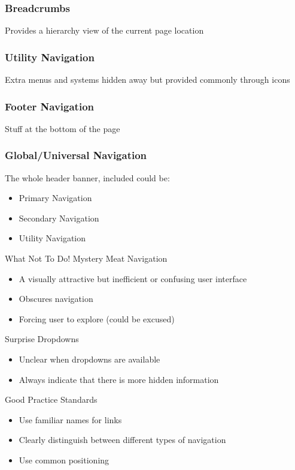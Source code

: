 \subsubsection{Breadcrumbs}
Provides a hierarchy view of the current page location
\subsubsection{Utility Navigation}
Extra menus and systems hidden away but provided commonly through icons
\subsubsection{Footer Navigation}
Stuff at the bottom of the page
\subsubsection{Global/Universal Navigation}
The whole header banner, included could be:
\begin{itemize}
	\item Primary Navigation
	\item Secondary Navigation
	\item Utility Navigation
\end{itemize}

\begin{note}{What Not To Do!}
	Mystery Meat Navigation
	\begin{itemize}
		\item A visually attractive but inefficient or confusing user interface
		\item Obscures navigation
		\item Forcing user to explore (could be excused)	
	\end{itemize}
	Surprise Dropdowns
	\begin{itemize}
		\item Unclear when dropdowns are available
		\item Always indicate that there is more hidden information	
	\end{itemize}
\end{note}

\begin{note}{Good Practice Standards}
	\begin{itemize}
		\item Use familiar names for links
		\item Clearly distinguish between different types of navigation
		\item Use common positioning	
	\end{itemize}
	
\end{note}

